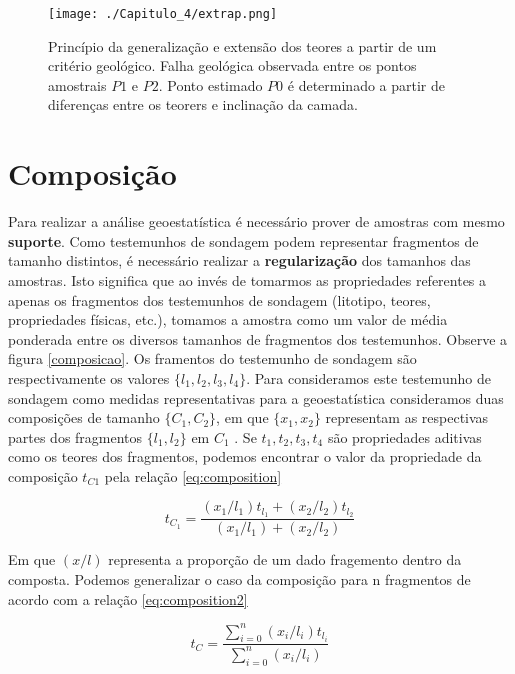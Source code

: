 \FloatBarrier
\begin{figure}[!htpb]
	\centering
	\texttt{[image: ./Capitulo\_4/extrap.png]}	
	\caption{Princípio da generalização e extensão dos teores a partir de um critério geológico. Falha geológica observada entre os pontos amostrais $P1$ e $P2$. Ponto estimado $P0$ é determinado a partir de diferenças entre os teorers e inclinação da camada. }
	\label{extrap}
\end{figure}
\FloatBarrier 

\section{Composição} 

Para realizar a análise geoestatística é necessário prover de amostras com mesmo \textbf{suporte}. Como testemunhos de sondagem podem representar fragmentos de tamanho distintos, é necessário realizar a \textbf{regularização} dos tamanhos das amostras. Isto significa que ao invés de tomarmos as propriedades referentes a apenas os fragmentos dos testemunhos de sondagem (litotipo, teores, propriedades físicas, etc.), tomamos a amostra como um valor de média ponderada entre os diversos tamanhos de fragmentos dos testemunhos. Observe a figura \ref{composicao}. Os framentos do testemunho de sondagem são respectivamente os valores $\{l_{1}, l_{2}, l_{3}, l_{4}\}$. Para consideramos este testemunho de sondagem como medidas representativas para a geoestatística consideramos duas composições de tamanho $\{C_{1}, C_{2}\}$, em que $\{x_{1}, x_{2}\}$ representam as respectivas partes dos fragmentos $\{l_{1}, l_{2}\}$ em $C_{1}$ . Se ${t_{1}, t_{2}, t_{3}, t_{4}}$ são propriedades aditivas como os teores dos fragmentos, podemos encontrar o valor da propriedade da composição $t_{C1}$ pela relação \eqref{eq:composition}

\begin{equation}\label{eq:composition}
t_{C_{1}} = \frac{(x_{1}/l_{1})t_{l_{1}} + (x_{2}/l_{2}) t_{l_{2}}}{(x_{1}/l_{1}) + (x_{2}/l_{2})}
\end{equation}

Em que $(x/l)$ representa a proporção de um dado fragemento dentro da composta. Podemos generalizar o caso da composição para n fragmentos de acordo com a relação \eqref{eq:composition2}

\begin{equation}\label{eq:composition2}
t_{C} = \frac{\sum_{i=0}^{n}(x_{i}/l_{i})t_{l_{i}} }{\sum_{i=0}^{n}(x_{i}/l_{i})}
\end{equation}

